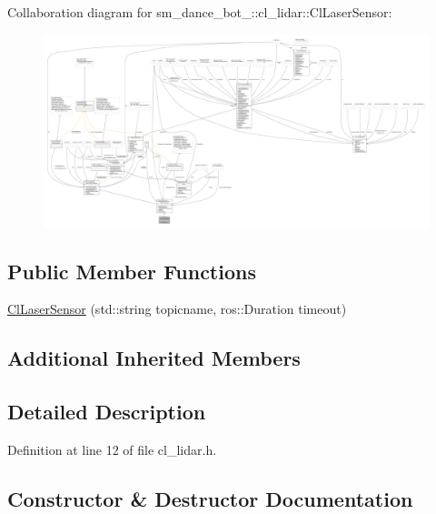 Collaboration diagram for sm\+\_\+dance\+\_\+bot\+\_\+:\+:cl\+\_\+lidar\+:\+:Cl\+Laser\+Sensor\+:\nopagebreak
\begin{figure}[H]
\begin{center}
\leavevmode
\includegraphics[width=350pt]{classsm__dance__bot__2_1_1cl__lidar_1_1ClLaserSensor__coll__graph}
\end{center}
\end{figure}
\subsection*{Public Member Functions}
\begin{DoxyCompactItemize}
\item 
\hyperlink{classsm__dance__bot__2_1_1cl__lidar_1_1ClLaserSensor_a548355dc7e35671bf138a4d530306f53}{Cl\+Laser\+Sensor} (std\+::string topicname, ros\+::\+Duration timeout)
\end{DoxyCompactItemize}
\subsection*{Additional Inherited Members}


\subsection{Detailed Description}


Definition at line 12 of file cl\+\_\+lidar.\+h.



\subsection{Constructor \& Destructor Documentation}
